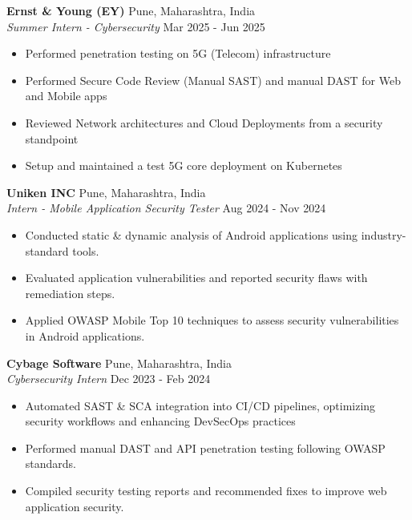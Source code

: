 \documentclass[a4paper]{article}
\begin{document}
\textbf{Ernst \& Young (EY)} \hfill Pune, Maharashtra, India\\
\textit{Summer Intern - Cybersecurity} \hfill Mar 2025 - Jun 2025\\
\vspace{-1mm}
\begin{itemize} \itemsep 1pt
	\item Performed penetration testing on 5G (Telecom) infrastructure
	\item Performed Secure Code Review (Manual SAST) and manual DAST for Web and Mobile apps
	\item Reviewed Network architectures and Cloud Deployments from a security standpoint
	\item Setup and maintained a test 5G core deployment on Kubernetes
\end{itemize}
\textbf{Uniken INC} \hfill Pune, Maharashtra, India\\
\textit{Intern - Mobile Application Security Tester} \hfill Aug 2024 - Nov 2024\\
\vspace{-1mm}
\begin{itemize} \itemsep 1pt
	\item Conducted static \& dynamic analysis of Android applications using industry-standard tools.
	\item Evaluated application vulnerabilities and reported security flaws with remediation steps.
	\item Applied OWASP Mobile Top 10 techniques to assess security vulnerabilities in Android applications.
\end{itemize}
\textbf{Cybage Software} \hfill Pune, Maharashtra, India\\
\textit{Cybersecurity Intern} \hfill Dec 2023 - Feb 2024\\
\vspace{-1mm}
\begin{itemize} \itemsep 1pt
	\item Automated SAST \& SCA integration into CI/CD pipelines, optimizing security workflows and enhancing DevSecOps practices
	\item Performed manual DAST and API penetration testing following OWASP standards.
	\item Compiled security testing reports and recommended fixes to improve web application security.
\end{itemize}
\end{document}
